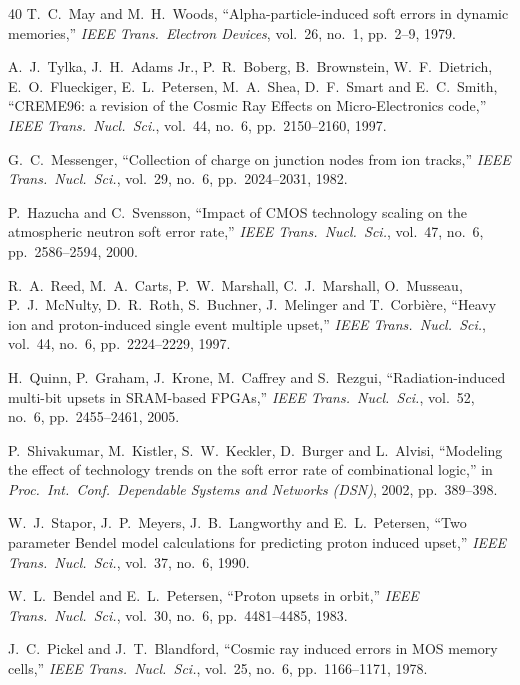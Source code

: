 \documentclass[11pt,a4paper]{article}
\begin{document}
\begin{thebibliography}{40}
T.~C.~May and M.~H.~Woods,
``Alpha-particle-induced soft errors in dynamic memories,''
\emph{IEEE Trans.\ Electron Devices}, vol.~26, no.~1, pp.~2--9, 1979.

A.~J.~Tylka, J.~H.~Adams Jr., P.~R.~Boberg, B.~Brownstein, W.~F.~Dietrich, E.~O.~Flueckiger, E.~L.~Petersen, M.~A.~Shea, D.~F.~Smart and E.~C.~Smith,
``CREME96: a revision of the Cosmic Ray Effects on Micro-Electronics code,''
\emph{IEEE Trans.\ Nucl.\ Sci.}, vol.~44, no.~6, pp.~2150--2160, 1997.

G.~C.~Messenger,
``Collection of charge on junction nodes from ion tracks,''
\emph{IEEE Trans.\ Nucl.\ Sci.}, vol.~29, no.~6, pp.~2024--2031, 1982.

P.~Hazucha and C.~Svensson,
``Impact of CMOS technology scaling on the atmospheric neutron soft error rate,''
\emph{IEEE Trans.\ Nucl.\ Sci.}, vol.~47, no.~6, pp.~2586--2594, 2000.

R.~A.~Reed, M.~A.~Carts, P.~W.~Marshall, C.~J.~Marshall, O.~Musseau, P.~J.~McNulty, D.~R.~Roth, S.~Buchner, J.~Melinger and T.~Corbi\`ere,
``Heavy ion and proton-induced single event multiple upset,''
\emph{IEEE Trans.\ Nucl.\ Sci.}, vol.~44, no.~6, pp.~2224--2229, 1997.

H.~Quinn, P.~Graham, J.~Krone, M.~Caffrey and S.~Rezgui,
``Radiation-induced multi-bit upsets in SRAM-based FPGAs,''
\emph{IEEE Trans.\ Nucl.\ Sci.}, vol.~52, no.~6, pp.~2455--2461, 2005.

P.~Shivakumar, M.~Kistler, S.~W.~Keckler, D.~Burger and L.~Alvisi,
``Modeling the effect of technology trends on the soft error rate of combinational logic,''
in \emph{Proc.\ Int.\ Conf.\ Dependable Systems and Networks (DSN)}, 2002, pp.~389--398.

W.~J.~Stapor, J.~P.~Meyers, J.~B.~Langworthy and E.~L.~Petersen,
``Two parameter Bendel model calculations for predicting proton induced upset,''
\emph{IEEE Trans.\ Nucl.\ Sci.}, vol.~37, no.~6, 1990.

W.~L.~Bendel and E.~L.~Petersen,
``Proton upsets in orbit,''
\emph{IEEE Trans.\ Nucl.\ Sci.}, vol.~30, no.~6, pp.~4481--4485, 1983.

J.~C.~Pickel and J.~T.~Blandford,
``Cosmic ray induced errors in MOS memory cells,''
\emph{IEEE Trans.\ Nucl.\ Sci.}, vol.~25, no.~6, pp.~1166--1171, 1978.


\end{thebibliography}
\end{document}
